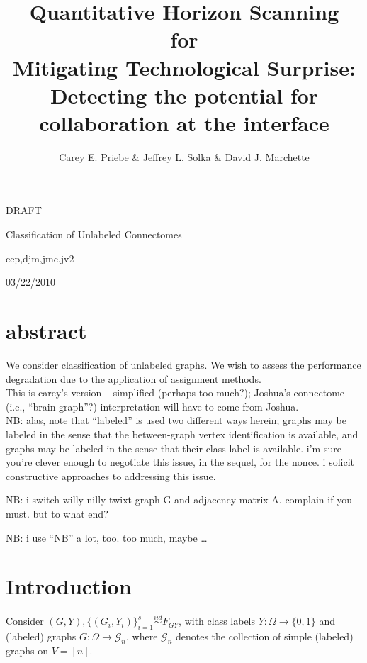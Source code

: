 \documentclass{article}
\title{Quantitative Horizon Scanning\\for\\Mitigating Technological Surprise:\\Detecting the potential for\\collaboration at the interface}
\author{Carey E. Priebe \& Jeffrey L. Solka \& David J. Marchette\\{}}
\newcommand{\mcG}{\mathcal{G}}
\begin{document}
\begin{center}
  {\Huge DRAFT}

\vspace*{1.0 in}

{\Large Classification of Unlabeled Connectomes}

\vspace*{0.5 in}

{\Large cep,djm,jmc,jv2}

\vspace*{0.5 in}

{\large 03/22/2010}

\vspace*{0.5 in}

\end{center}


\section*{abstract}

We consider classification of unlabeled graphs.
We wish to assess the performance degradation
due to the application of assignment methods.
\\


This is carey's version -- simplified (perhaps too much?);
Joshua's connectome (i.e., ``brain graph''?) interpretation will have to come from Joshua.
\\

NB: alas, note that ``labeled'' is used two different ways herein;
graphs may be labeled in the sense that the between-graph vertex identification is available,
and graphs may be labeled in the sense that their class label is available.
i'm sure you're clever enough to negotiate this issue, in the sequel, for the nonce.
i solicit constructive approaches to addressing this issue.

NB: i switch willy-nilly twixt graph G and adjacency matrix A.
complain if you must. but to what end?

NB: i use ``NB'' a lot, too. too much, maybe \dots


\section{Introduction}

Consider $(G,Y),\{(G_i,Y_i)\}_{i=1}^s \overset{iid}{\sim} F_{GY}$,
with class labels $Y:\Omega \rightarrow \{0,1\}$ and
(labeled) graphs $G:\Omega \rightarrow \mcG_n$,
where $\mcG_n$ denotes the collection of simple (labeled) graphs on $V=[n]$.
\end{document}
